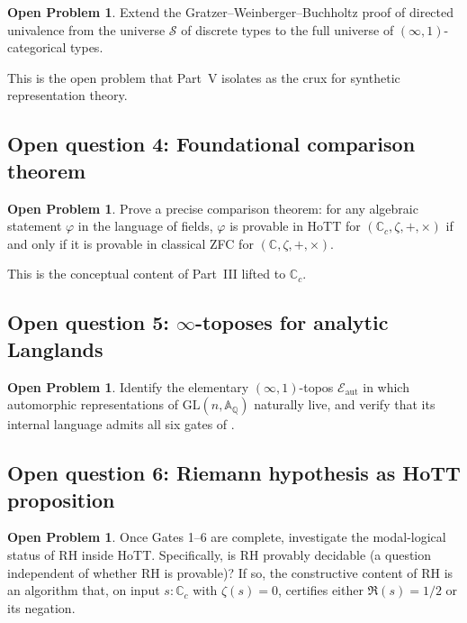 \documentclass[12pt]{article}
\theoremstyle{definition}
\newtheorem{problem}[theorem]{Open Problem}
\theoremstyle{remark}
\newcommand{\Q}{\mathbb{Q}}
\newcommand{\C}{\mathbb{C}}
\newcommand{\Cc}{\C_{c}}
\newcommand{\Spc}{\mathcal{S}}
\begin{document}
\begin{problem}\label{prob:openDua}
Extend the Gratzer--Weinberger--Buchholtz proof of directed univalence
from the universe $\Spc$ of discrete types to the full universe of
$(\infty,1)$-categorical types.
\end{problem}

This is the open problem that Part~V isolates as the crux for synthetic
representation theory.

\subsection{Open question 4: Foundational comparison theorem}

\begin{problem}\label{prob:openFound}
Prove a precise comparison theorem: for any algebraic statement
$\varphi$ in the language of fields, $\varphi$ is provable in HoTT for
$(\Cc, \zeta, +, \times)$ if and only if it is provable in classical
ZFC for $(\C, \zeta, +, \times)$.
\end{problem}

This is the conceptual content of Part~III lifted to $\Cc$.

\subsection{Open question 5: \texorpdfstring{$\infty$}{infinity}-toposes for analytic Langlands}

\begin{problem}\label{prob:openLanglands}
Identify the elementary $(\infty,1)$-topos $\mathcal{E}_{\mathrm{aut}}$
in which automorphic representations of $\mathrm{GL}(n,\mathbb{A}_\Q)$
naturally live, and verify that its internal language admits all six
gates of .
\end{problem}

\subsection{Open question 6: Riemann hypothesis as HoTT proposition}

\begin{problem}\label{prob:openRH}
Once Gates 1--6 are complete, investigate the modal-logical status of
$\mathrm{RH}$ inside HoTT\@. Specifically, is $\mathrm{RH}$ provably
decidable (a question independent of whether $\mathrm{RH}$ is
provable)? If so, the constructive content of $\mathrm{RH}$ is an
algorithm that, on input $s : \Cc$ with $\zeta(s) = 0$, certifies either
$\Re(s) = 1/2$ or its negation.
\end{problem}
\end{document}
